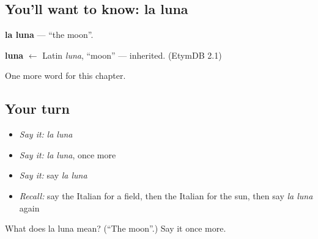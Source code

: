 \subsection*{You'll want to know: la luna}
\textbf{la luna} — \textquotedblleft{}the moon\textquotedblright{}.

\begin{cousinweb}
\textbf{luna} $\leftarrow$ Latin \emph{luna}, \textquotedblleft{}moon\textquotedblright{} — inherited. (EtymDB 2.1)
\end{cousinweb}

\begin{grammarlens}[title={What you've built}]
One more word for this chapter.
\end{grammarlens}

\subsection*{Your turn}
\begin{itemize}
\raggedright
  \item \emph{Say it:} \emph{la luna}
  \item \emph{Say it:} \emph{la luna}, once more
  \item \emph{Say it:} say \emph{la luna}
  \item \emph{Recall:} say the Italian for a field, then the Italian for the sun, then say \emph{la luna} again
\end{itemize}

\begin{tcolorbox}[breakable,colback=teal!4,colframe=teal!35!black,title={Before you move on}]
What does la luna mean? (\textquotedblleft{}The moon\textquotedblright{}.) Say it once more.
\end{tcolorbox}
